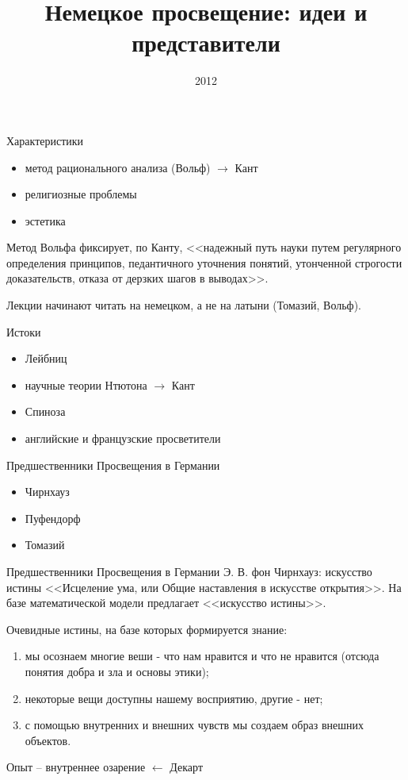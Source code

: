 \documentclass{beamer}
\title[Немецкое просвещение]{Немецкое просвещение: идеи и представители}
\date{2012}
\begin{document}
    \begin{frame}
        \titlepage
    \end{frame}

    \begin{frame}{Характеристики}
        \begin{itemize}
        \item метод рационального анализа (Вольф) $\rightarrow$ Кант
        \item религиозные проблемы
        \item эстетика
        \end{itemize}
        Метод Вольфа фиксирует, по Канту,
        <<надежный путь науки путем регулярного определения принципов,
        педантичного уточнения понятий, утонченной строгости доказательств,
        отказа от дерзких шагов в выводах>>.

        Лекции начинают читать на немецком, а не на латыни (Томазий, Вольф).
    \end{frame}

    \begin{frame}{Истоки}
        \begin{itemize}
        \item Лейбниц
        \item научные теории Нтютона $\rightarrow$ Кант
        \item Спиноза
        \item английские и французские просветители
        \end{itemize}
    \end{frame}

    \begin{frame}{Предшественники Просвещения в Германии}
        \begin{itemize}
        \item Чирнхауз
        \item Пуфендорф
        \item Томазий
        \end{itemize}
    \end{frame}

    \begin{frame}{Предшественники Просвещения в Германии}
            {Э. В. фон Чирнхауз: искусство истины}
        <<Исцеление ума, или Общие наставления в искусстве открытия>>.
        На базе математической модели предлагает <<искусство истины>>.

        Очевидные истины, на базе которых формируется знание:
        \begin{enumerate}
        \item мы осознаем многие веши - что нам нравится и что не нравится
            (отсюда понятия добра и зла и основы этики);
        \item некоторые вещи доступны нашему восприятию, другие - нет;
        \item с помощью внутренних и внешних чувств
            мы создаем образ внешних объектов.
        \end{enumerate}
        Опыт -- внутреннее озарение $\leftarrow$ Декарт
    \end{frame}
\end{document}
